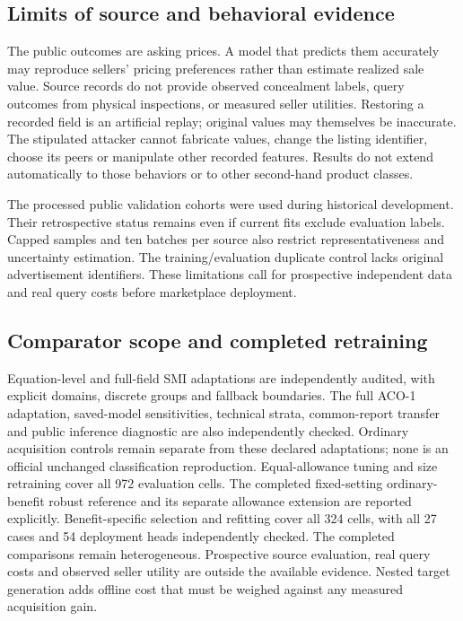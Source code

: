 \subsection{Limits of source and behavioral evidence}
The public outcomes are asking prices. A model that predicts them
accurately may reproduce sellers' pricing preferences rather than
estimate realized sale value. Source records do not provide observed
concealment labels, query outcomes from physical inspections, or
measured seller utilities. Restoring a recorded field is an artificial
replay; original values may themselves be inaccurate. The stipulated
attacker cannot fabricate values, change the listing identifier, choose
its peers or manipulate other recorded features. Results do not extend
automatically to those behaviors or to other second-hand product classes.

The processed public validation cohorts were used during historical
development. Their retrospective status remains even if current fits
exclude evaluation labels. Capped samples and ten batches per source
also restrict representativeness and uncertainty estimation. The
training/evaluation duplicate control lacks original advertisement
identifiers. These limitations call for prospective independent data
and real query costs before marketplace deployment.

\subsection{Comparator scope and completed retraining}
Equation-level and full-field SMI adaptations are independently audited,
with explicit domains, discrete groups and fallback boundaries. The full
ACO-1 adaptation, saved-model sensitivities, technical strata, common-report
transfer and public inference diagnostic are also independently checked.
Ordinary acquisition controls remain separate from these declared
adaptations; none is an official unchanged classification reproduction.
Equal-allowance tuning and size retraining cover all 972 evaluation cells.
The completed fixed-setting ordinary-benefit robust reference and its separate
allowance extension are reported explicitly. Benefit-specific selection and
refitting cover all 324 cells, with all 27 cases and 54 deployment heads
independently checked. The completed comparisons remain heterogeneous.
Prospective source evaluation, real query costs and observed seller utility
are outside the available evidence. Nested target generation adds offline
cost that must be weighed against any measured acquisition gain.

